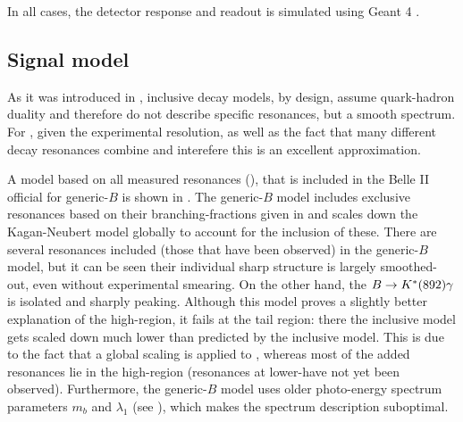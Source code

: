 In all cases, the detector response and readout is simulated using Geant 4 \cite{GEANT4:2002zbu}.


\subsection{Signal model}\label{sec:signal_model}

As it was introduced in , inclusive decay models, by design, assume quark-hadron duality and therefore do not describe specific resonances, but a smooth spectrum.
For \BtoXsgamma, given the experimental resolution, as well as the fact that many different decay resonances combine and interefere this is an excellent approximation.

A model based on all measured resonances (), that is included in the Belle II official \MC for generic-$B$ is shown in .
The generic-$B$ model includes exclusive resonances based on their branching-fractions given in  and scales down the Kagan-Neubert model globally to account for the inclusion of these.
There are several resonances included (those that have been observed) in the generic-$B$ model, but it can be seen their individual sharp structure is largely smoothed-out, even without experimental smearing.
On the other hand, the $B\rightarrow K^*(892)\gamma$ is isolated and sharply peaking.
Although this model proves a slightly better explanation of the high-\EB region, it fails at the tail region: there the inclusive model gets scaled down much lower than predicted by the inclusive model.
This is due to the fact that a global scaling is applied to \BtoXsgamma, whereas most of the added resonances lie in the high-\EB region (resonances at lower-\EB have not yet been observed).
Furthermore, the generic-$B$ model uses older \BtoXsgamma photo-energy spectrum parameters $m_b$ and $\lambda_1$ (see ), which makes the spectrum description suboptimal.

